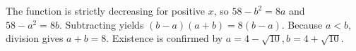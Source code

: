 The function is strictly decreasing for positive $x$, so $58-b^2=8a$ and $58-a^2=8b$. Subtracting yields $(b-a)(a+b)=8(b-a)$. Because $a<b$, division gives $\boxed{a+b=8}$. Existence is confirmed by $a=4-\sqrt{10},b=4+\sqrt{10}$.
